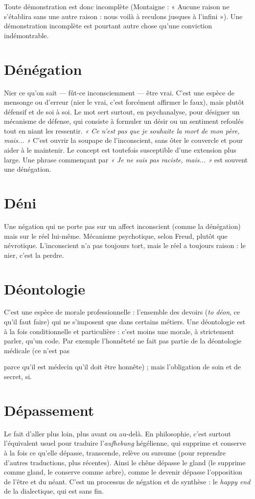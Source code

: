Toute démonstration est donc incomplète (Montaigne : « Aucune raison
ne s’établira sans une autre raison : nous voilà à reculons jusques à l’infini »).
Une démonstration incomplète est pourtant autre chose qu’une conviction
indémontrable.

\section{Dénégation}
Nier ce qu’on sait — fût-ce inconsciemment — être vrai.
C’est une espèce de mensonge ou d’erreur (nier le vrai,
c’est forcément affirmer le faux), mais plutôt défensif et de soi à soi. Le mot sert
surtout, en psychanalyse, pour désigner un mécanisme de défense, qui consiste
à formuler un désir ou un sentiment refoulés tout en niant les ressentir. {\it « Ce
n'est pas que je souhaite la mort de mon père, mais... »} C’est ouvrir la soupape de
l'inconscient, sans ôter le couvercle et pour aider à le maintenir. Le concept est
toutefois susceptible d’une extension plus large. Une phrase commençant par
{\it « Je ne suis pas raciste, mais... »} est souvent une dénégation.

\section{Déni}
Une négation qui ne porte pas sur un affect inconscient (comme la
dénégation) mais sur le réel lui-même. Mécanisme psychotique,
selon Freud, plutôt que névrotique. L’inconscient n’a pas toujours tort, mais le
réel a toujours raison : le nier, c’est la perdre.

\section{Déontologie}
C’est une espèce de morale professionnelle : l’ensemble
des devoirs ({\it to déon}, ce qu’il faut faire) qui ne s'imposent
que dans certains métiers. Une déontologie est à la fois conditionnelle et
particulière : c’est moins une morale, à strictement parler, qu’un code. Par
exemple l'honnêteté ne fait pas partie de la déontologie médicale (ce n’est pas

parce qu’il est médecin qu’il doit être honnête) ; mais l’obligation de soin et de
secret, si.

\section{Dépassement}
Le fait d’aller plus loin, plus avant ou au-delà. En philosophie,
c’est surtout l'équivalent usuel pour traduire
l'{\it aufhebung} hégélienne, qui supprime et conserve à la fois ce qu’elle dépasse,
transcende, relève ou sursume (pour reprendre d’autres traductions, plus
récentes). Ainsi le chêne dépasse le gland (le supprime comme gland, le
conserve comme arbre), comme le devenir dépasse l’opposition de l'être et du
néant. C’est un processus de négation et de synthèse : le {\it happy end} de la dialectique,
qui est sans fin.

